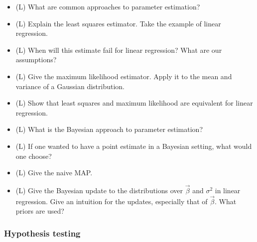 \begin{itemize}
    \item (L) What are common approaches to parameter estimation?
    \item (L) Explain the least squares estimator. Take the example of linear regression.
    \item (L) When will this estimate fail for linear regression? What are our assumptions?
    \item (L) Give the maximum likelihood estimator. Apply it to the mean and variance of a Gaussian distribution.
    \item (L) Show that least squares and maximum likelihood are equivalent for linear regression.
    \item (L) What is the Bayesian approach to parameter estimation?
    \item (L) If one wanted to have a point estimate in a Bayesian setting, what would one choose?
    \item (L) Give the naive MAP.
    \item (L) Give the Bayesian update to the distributions over $\vec{\beta}$ and $\sigma^2$ in linear regression.
    Give an intuition for the updates, especially that of $\vec{\beta}$.
    What priors are used?
\end{itemize}

\subsubsection*{Hypothesis testing}

